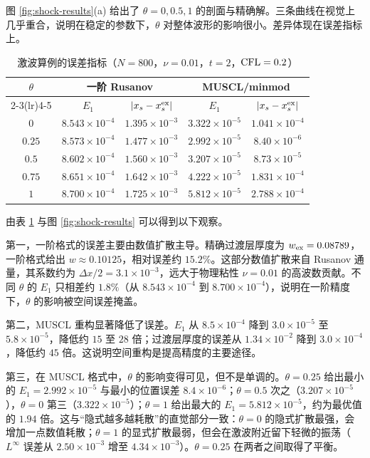 图 \ref{fig:shock-results}(a) 给出了 $\theta=0,0.5,1$ 的剖面与精确解。三条曲线在视觉上几乎重合，说明在稳定的参数下，$\theta$ 对整体波形的影响很小。差异体现在误差指标上。

\begin{table}[htbp]
  \centering
  \caption{激波算例的误差指标（$N=800$，$\nu=0.01$，$t=2$，$\mathrm{CFL}=0.2$）}
  \label{tab:shock-metrics}
  \small
  \begin{tabular}{ccccc}
    \toprule
    $\theta$ & \multicolumn{2}{c}{一阶 Rusanov} & \multicolumn{2}{c}{MUSCL/minmod} \\
    \cmidrule(lr){2-3}\cmidrule(lr){4-5}
     & $E_1$ & $|x_s-x_s^{\rm ex}|$ & $E_1$ & $|x_s-x_s^{\rm ex}|$ \\
    \midrule
    $0$    & $8.543\times10^{-4}$ & $1.395\times10^{-3}$ & $3.322\times10^{-5}$ & $1.041\times10^{-4}$ \\
    $0.25$ & $8.573\times10^{-4}$ & $1.477\times10^{-3}$ & $2.992\times10^{-5}$ & $8.40\times10^{-6}$ \\
    $0.5$  & $8.602\times10^{-4}$ & $1.560\times10^{-3}$ & $3.207\times10^{-5}$ & $8.73\times10^{-5}$ \\
    $0.75$ & $8.651\times10^{-4}$ & $1.642\times10^{-3}$ & $4.222\times10^{-5}$ & $1.831\times10^{-4}$ \\
    $1$    & $8.700\times10^{-4}$ & $1.725\times10^{-3}$ & $5.812\times10^{-5}$ & $2.788\times10^{-4}$ \\
    \bottomrule
  \end{tabular}
\end{table}

由表 \ref{tab:shock-metrics} 与图 \ref{fig:shock-results} 可以得到以下观察。

第一，一阶格式的误差主要由数值扩散主导。精确过渡层厚度为 $w_{\rm ex}=0.08789$，一阶格式给出 $w\approx0.10125$，相对误差约 $15.2\%$。这部分数值扩散来自 Rusanov 通量，其系数约为 $\Delta x/2=3.1\times10^{-3}$，远大于物理粘性 $\nu=0.01$ 的高波数贡献。不同 $\theta$ 的 $E_1$ 只相差约 $1.8\%$（从 $8.543\times10^{-4}$ 到 $8.700\times10^{-4}$），说明在一阶精度下，$\theta$ 的影响被空间误差掩盖。

第二，MUSCL 重构显著降低了误差。$E_1$ 从 $8.5\times10^{-4}$ 降到 $3.0\times10^{-5}$ 至 $5.8\times10^{-5}$，降低约 $15$ 至 $28$ 倍；过渡层厚度的误差从 $1.34\times10^{-2}$ 降到 $3.0\times10^{-4}$，降低约 $45$ 倍。这说明空间重构是提高精度的主要途径。

第三，在 MUSCL 格式中，$\theta$ 的影响变得可见，但不是单调的。$\theta=0.25$ 给出最小的 $E_1=2.992\times10^{-5}$ 与最小的位置误差 $8.4\times10^{-6}$；$\theta=0.5$ 次之（$3.207\times10^{-5}$），$\theta=0$ 第三（$3.322\times10^{-5}$）；$\theta=1$ 给出最大的 $E_1=5.812\times10^{-5}$，约为最优值的 $1.94$ 倍。这与“隐式越多越耗散”的直觉部分一致：$\theta=0$ 的隐式扩散最强，会增加一点数值耗散；$\theta=1$ 的显式扩散最弱，但会在激波附近留下轻微的振荡（$L^\infty$ 误差从 $2.50\times10^{-3}$ 增至 $4.34\times10^{-3}$）。$\theta=0.25$ 在两者之间取得了平衡。

